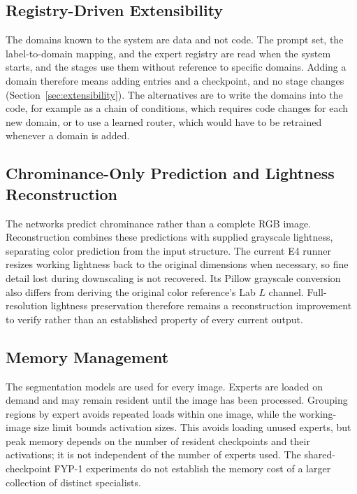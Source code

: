 \documentclass{FastFyp}
\begin{document}
\subsection{Registry-Driven Extensibility}

The domains known to the system are data and not code. The prompt set, the label-to-domain mapping, and the expert registry are read when the system starts, and the stages use them without reference to specific domains. Adding a domain therefore means adding entries and a checkpoint, and no stage changes (Section~\ref{sec:extensibility}). The alternatives are to write the domains into the code, for example as a chain of conditions, which requires code changes for each new domain, or to use a learned router, which would have to be retrained whenever a domain is added.

\subsection{Chrominance-Only Prediction and Lightness Reconstruction}

The networks predict chrominance rather than a complete RGB image. Reconstruction combines these predictions with supplied grayscale lightness, separating color prediction from the input structure. The current E4 runner resizes working lightness back to the original dimensions when necessary, so fine detail lost during downscaling is not recovered. Its Pillow grayscale conversion also differs from deriving the original color reference's Lab $L$ channel. Full-resolution lightness preservation therefore remains a reconstruction improvement to verify rather than an established property of every current output.

\subsection{Memory Management}

The segmentation models are used for every image. Experts are loaded on demand and may remain resident until the image has been processed. Grouping regions by expert avoids repeated loads within one image, while the working-image size limit bounds activation sizes. This avoids loading unused experts, but peak memory depends on the number of resident checkpoints and their activations; it is not independent of the number of experts used. The shared-checkpoint FYP-1 experiments do not establish the memory cost of a larger collection of distinct specialists.
\end{document}
